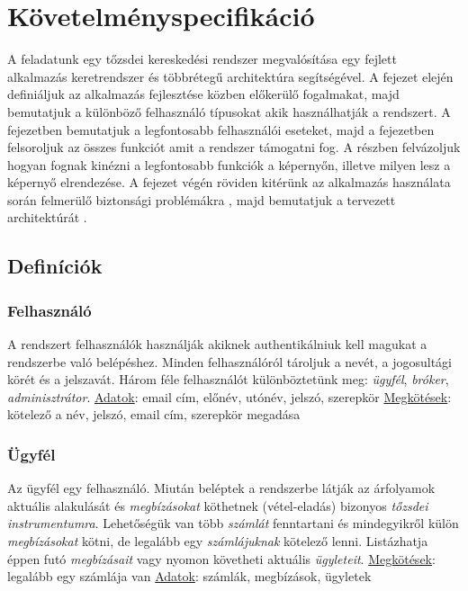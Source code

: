 \chapter{Követelményspecifikáció}\label{sect:kovspec}
A feladatunk egy tőzsdei kereskedési rendszer megvalósítása egy fejlett alkalmazás keretrendszer és többrétegű architektúra segítségével. A fejezet elején  definiáljuk az alkalmazás fejlesztése közben előkerülő fogalmakat, majd bemutatjuk a különböző felhasználó típusokat akik használhatják a rendszert.
A  fejezetben bemutatjuk a legfontosabb felhasználói eseteket, majd a  fejezetben felsoroljuk az összes funkciót amit a rendszer támogatni fog. A  részben felvázoljuk hogyan fognak kinézni a legfontosabb funkciók a képernyőn, illetve milyen lesz a képernyő elrendezése.
A fejezet végén röviden kitérünk az alkalmazás használata során felmerülő biztonsági problémákra , majd bemutatjuk a tervezett architektúrát .

\section{Definíciók}\label{sect:defs}

\subsection{Felhasználó}
A rendszert felhasználók használják akiknek authentikálniuk kell magukat a rendszerbe való belépéshez. Minden felhasználóról tároljuk a nevét, a jogosultági körét és a jelszavát. Három féle felhasználót különböztetünk meg: \emph{ügyfél}, \emph{bróker}, \emph{adminisztrátor}.
\newline \underline{Adatok}: email cím, előnév, utónév, jelszó, szerepkör
\newline \underline{Megkötések}: kötelező a név, jelszó, email cím, szerepkör megadása

\subsection{Ügyfél}
Az ügyfél egy felhasználó. Miután beléptek a rendszerbe látják az árfolyamok aktuális alakulását és \emph{megbízásokat} köthetnek (vétel-eladás) bizonyos \emph{tőzsdei instrumentumra}. Lehetőségük van több \emph{számlát} fenntartani és mindegyikről külön \emph{megbízásokat} kötni, de legalább egy \emph{számlájuknak} kötelező lenni. Listázhatja éppen futó \emph{megbízásait} vagy nyomon követheti aktuális \emph{ügyleteit}.
\newline \underline{Megkötések}: legalább egy számlája van
\newline \underline{Adatok}: számlák, megbízások, ügyletek


